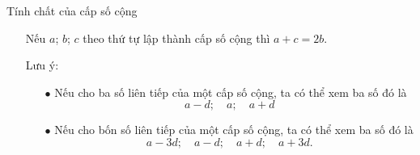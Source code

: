 \begin{dang}{Tính chất của cấp số cộng}
	\begin{itemize}
		\item [\ding{172}] Nếu $a$; $b$; $c$ theo thứ tự lập thành cấp số cộng thì $a+c=2b$.
		\item [\ding{173}] Lưu ý:
		\begin{itemize}
			\item [$\bullet$] Nếu cho ba số liên tiếp của một cấp số cộng, ta có thể xem ba số đó là $$a-d;\quad a; \quad a+d$$
			\item [$\bullet$] Nếu cho bốn số liên tiếp của một cấp số cộng, ta có thể xem ba số đó là $$a-3d;\quad a-d; \quad a+d; \quad a+3d.$$
		\end{itemize}
	\end{itemize}
\end{dang}
 


